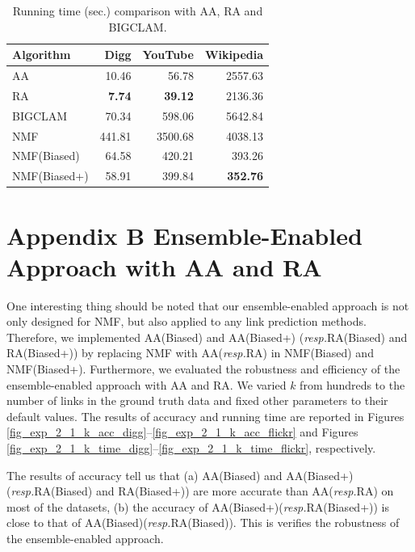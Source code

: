 \documentclass[10pt,journal,compsoc]{IEEEtran}
\newcommand{\NMF}{{\sf NMF}\xspace }
\newcommand{\Biased}{{\sf NMF(Biased)}\xspace}
\newcommand{\Aa}{{\sf AA}\xspace }
\newcommand{\RA}{{\sf RA}\xspace }
\newcommand{\BIGCLAM}{{\sf BIGCLAM}\xspace}
\newcommand{\Biasedp}{{\sf NMF(Biased+)}\xspace}
\newcommand{\AABiased}{{\sf AA(Biased)}\xspace}
\newcommand{\AABiasedp}{{\sf AA(Biased+)}\xspace}
\newcommand{\RABiased}{{\sf RA(Biased)}\xspace}
\newcommand{\RABiasedp}{{\sf RA(Biased+)}\xspace}
\newcommand{\resp}{\emph{resp.}\xspace}
\begin{document}
\begin{table}
\caption{Running time (sec.) comparison with \Aa, \RA and \BIGCLAM.}
\label{tab_time}
\vspace{-2ex}
\centering
\newcommand{\tabincell}[2]{\begin{tabular}{@{}#1@{}}#2\end{tabular}}
\begin{tabular}{l|r|r|r}
\hline \hline Algorithm  & Digg & YouTube & Wikipedia  \\
\hline \hline
\Aa & 10.46 &	56.78 &	2557.63  \\
\RA & \textbf{7.74} &	\textbf{39.12} &	2136.36  \\
\BIGCLAM & 70.34 &	598.06 &	5642.84  \\
\NMF & 441.81 	& 3500.68 	& 4038.13 \\
\Biased & 64.58	& 420.21	& 393.26 \\
\Biasedp & 58.91	& 399.84	& \textbf{352.76} \\
\hline \hline
\end{tabular}
\vspace{-2ex}
\end{table}





\section{Appendix B Ensemble-Enabled Approach with AA and RA}

One interesting thing should be noted that our ensemble-enabled
approach is not only designed for \NMF, but also applied to any link
prediction methods. Therefore, we implemented \AABiased and \AABiasedp
(\resp \RABiased and \RABiasedp) by replacing \NMF with \Aa (\resp \RA) in
\Biased and \Biasedp. Furthermore, we evaluated the robustness and efficiency
of the ensemble-enabled approach with \Aa and \RA.
We varied $k$ from hundreds to the number of links in the ground truth data
and fixed other parameters to their default values. The results of accuracy
and running time are reported in Figures \ref{fig_exp_2_1_k_acc_digg}--\ref{fig_exp_2_1_k_acc_flickr}
and Figures \ref{fig_exp_2_1_k_time_digg}--\ref{fig_exp_2_1_k_time_flickr}, respectively.

The results of accuracy tell us that (a) \AABiased and \AABiasedp (\resp \RABiased and \RABiasedp)
are more accurate than \Aa (\resp \RA) on most of the datasets,
(b) the accuracy of \AABiasedp (\resp \RABiasedp) is close to that of \AABiased (\resp \RABiased).
This is verifies the robustness of the ensemble-enabled approach.
\end{document}
